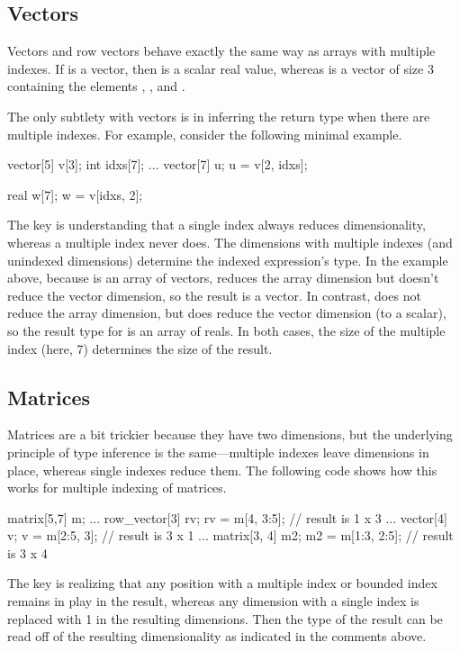\subsection{Vectors}

Vectors and row vectors behave exactly the same way as arrays with
multiple indexes.  If  is a vector, then  is a
scalar real value, whereas  is a vector of size 3
containing the elements , , and .

The only subtlety with vectors is in inferring the return type when
there are multiple indexes. For example, consider the following
minimal example.
%
\begin{stancode}
vector[5] v[3];
int idxs[7];
...
vector[7] u;
u = v[2, idxs];

real w[7];
w = v[idxs, 2];
\end{stancode}
%
The key is understanding that a single index always reduces
dimensionality, whereas a multiple index never does.  The dimensions
with multiple indexes (and unindexed dimensions) determine the indexed
expression's type.  In the example above, because  is an array
of vectors,  reduces the array dimension but doesn't
reduce the vector dimension, so the result is a vector.  In contrast,
 does not reduce the array dimension, but does reduce
the vector dimension (to a scalar), so the result type for  is
an array of reals.  In both cases, the size of the multiple index
(here, 7) determines the size of the result.

\subsection{Matrices}

Matrices are a bit trickier because they have two dimensions, but the
underlying principle of type inference is the same---multiple indexes
leave dimensions in place, whereas single indexes reduce them.  The
following code shows how this works for multiple indexing of matrices.
%
\begin{stancode}
matrix[5,7] m;
...
row_vector[3] rv;
rv = m[4, 3:5];    // result is 1 x 3
...
vector[4] v;
v = m[2:5, 3];     // result is 3 x 1
...
matrix[3, 4] m2;
m2 = m[1:3, 2:5];  // result is 3 x 4
\end{stancode}
%
The key is realizing that any position with a multiple index or
bounded index remains in play in the result, whereas any dimension
with a single index is replaced with 1 in the resulting dimensions.
Then the type of the result can be read off of the resulting
dimensionality as indicated in the comments above.

